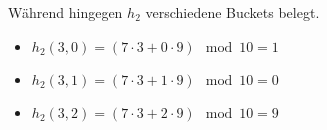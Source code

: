 \documentclass{bschlangaul-aufgabe}
\begin{document}
\begin{enumerate}
\begin{bAntwort}
Während hingegen $h_2$ verschiedene Buckets belegt.

\begin{itemize}
\item $h_2(3,0) = (7 \cdot 3 + 0 \cdot 9) \mod 10 = 1$
\item $h_2(3,1) = (7 \cdot 3 + 1 \cdot 9) \mod 10 = 0$
\item $h_2(3,2) = (7 \cdot 3 + 2 \cdot 9) \mod 10 = 9$
\end{itemize}
\end{bAntwort}
\end{enumerate}
\end{document}
